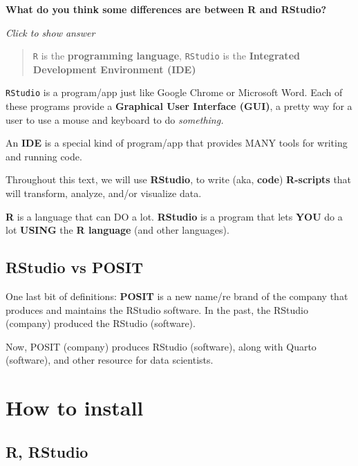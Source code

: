 \documentclass[
]{book}
\begin{document}
\textbf{What do you think some differences are between R and RStudio?}

\emph{Click to show answer}

\begin{quote}
\texttt{R} is the \textbf{programming language},
\texttt{RStudio} is the \textbf{Integrated Development Environment (IDE)}
\end{quote}

\texttt{RStudio} is a program/app just like Google Chrome or Microsoft Word. Each
of these programs provide a \textbf{Graphical User Interface (GUI)}, a pretty way for
a user to use a mouse and keyboard to do \emph{something.}

An \textbf{IDE} is a special kind of program/app that provides MANY tools for writing and running code.

Throughout this text, we will use \textbf{RStudio}, to write (aka, \textbf{code}) \textbf{R-scripts} that will transform, analyze, and/or visualize data.

\textbf{R} is a language that can DO a lot.
\textbf{RStudio} is a program that lets \textbf{YOU} do a lot \textbf{USING} the \textbf{R language} (and other languages).

\hypertarget{rstudio-vs-posit}{%
\subsection*{RStudio vs POSIT}\label{rstudio-vs-posit}}

One last bit of definitions: \textbf{POSIT} is a new name/re brand of the company that produces and maintains the RStudio software. In the past, the RStudio (company) produced the RStudio (software).

Now, POSIT (company) produces RStudio (software), along with Quarto (software), and other resource for data scientists.

\hypertarget{how-to-install}{%
\section*{How to install}\label{how-to-install}}

\hypertarget{r-rstudio}{%
\subsection{R, RStudio}\label{r-rstudio}}
\end{document}
